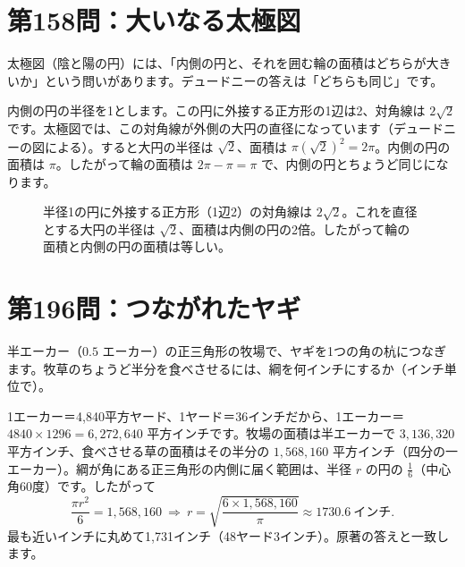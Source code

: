 \documentclass[a4paper,11pt,openany]{ltjsbook}
\begin{document}
\section{第158問：大いなる太極図}

太極図（陰と陽の円）には、「内側の円と、それを囲む輪の面積はどちらが大きいか」という問いがあります。デュードニーの答えは「どちらも同じ」です。

内側の円の半径を1とします。この円に外接する正方形の1辺は2、対角線は $2\sqrt2$ です。太極図では、この対角線が外側の大円の直径になっています（デュードニーの図による）。すると大円の半径は $\sqrt2$、面積は $\pi(\sqrt2)^2=2\pi$。内側の円の面積は $\pi$。したがって輪の面積は $2\pi-\pi=\pi$ で、内側の円とちょうど同じになります。

\begin{figure}[htbp]
\centering
{}
\caption{半径1の円に外接する正方形（1辺2）の対角線は $2\sqrt2$。これを直径とする大円の半径は $\sqrt2$、面積は内側の円の2倍。したがって輪の面積と内側の円の面積は等しい。}
\end{figure}

\section{第196問：つながれたヤギ}

半エーカー（$0.5$ エーカー）の正三角形の牧場で、ヤギを1つの角の杭につなぎます。牧草のちょうど半分を食べさせるには、綱を何インチにするか（インチ単位で）。

1エーカー＝4,840平方ヤード、1ヤード＝36インチだから、1エーカー＝$4840\times1296=6{,}272{,}640$ 平方インチです。牧場の面積は半エーカーで $3{,}136{,}320$ 平方インチ、食べさせる草の面積はその半分の $1{,}568{,}160$ 平方インチ（四分の一エーカー）。綱が角にある正三角形の内側に届く範囲は、半径 $r$ の円の $\tfrac16$（中心角60度）です。したがって
\[
\frac{\pi r^2}{6}=1{,}568{,}160\ \Longrightarrow\ r=\sqrt{\frac{6\times1{,}568{,}160}{\pi}}\approx1730.6\ \text{インチ}.
\]
最も近いインチに丸めて1,731インチ（48ヤード3インチ）。原著の答えと一致します。
\end{document}

